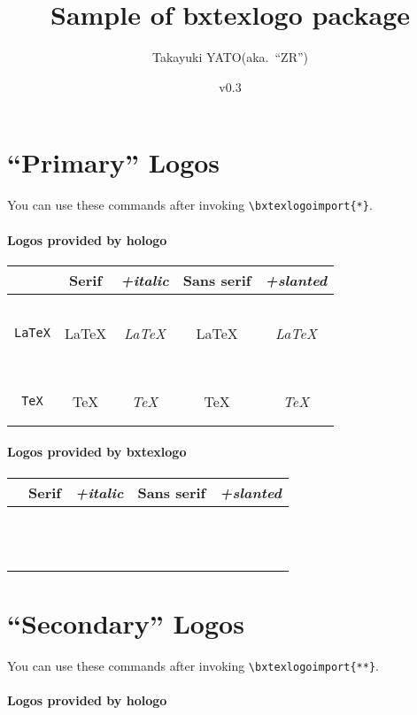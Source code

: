 \documentclass[a4paper]{article}
\newcommand{\PkgVersion}{0.3}
\newcommand{\PkgDate}{2017/11/11}
\newcommand{\Pkg}[1]{\textsf{#1}}
\newenvironment{LogoSamples}{%
  \begin{center}\begin{tabular}{ccccc}
    \hline \phantom{\LARGE I}
        & \textrm{Serif} & \textit{+italic}
        & \textsf{Sans serif} & \textsl{+slanted}
    \\\hline
}{%
    \hline
  \end{tabular}\end{center}
}
\newcommand*{\LSEntry}[1]{%
  \texttt{\string#1} & \textrm{#1} & \textit{#1}
      & \textsf{#1} & \textsf{\textsl{#1}}
  \\}
\begin{document}
\title{Sample of \Pkg{bxtexlogo} package}
\author{Takayuki YATO\quad (aka.~``ZR'')}
\date{v\PkgVersion \quad[\PkgDate]}
\maketitle

\section{``Primary'' Logos}

You can use these commands after invoking
\verb|\bxtexlogoimport{*}|.

\paragraph{Logos provided by \Pkg{hologo}}\mbox{}

\begin{LogoSamples}
\LSEntry{\AmSLaTeX}
\LSEntry{\AmSTeX}
\LSEntry{\BibTeX}
\LSEntry{\ConTeXt}
\LSEntry{\eTeX}
\LSEntry{\LaTeX}
\LSEntry{\LaTeXe}
\LSEntry{\LuaLaTeX}
\LSEntry{\LuaTeX}
\LSEntry{\LyX}
\LSEntry{\METAFONT}
\LSEntry{\METAPOST}
\LSEntry{\pdfTeX}
\LSEntry{\pdfLaTeX}
\LSEntry{\TeX}
\LSEntry{\XeLaTeX}
\LSEntry{\XeTeX}
\end{LogoSamples}

\paragraph{Logos provided by \Pkg{bxtexlogo}}\mbox{}

\begin{LogoSamples}
\LSEntry{\epTeX}
\LSEntry{\eupTeX}
\LSEntry{\JBibTeX}
\LSEntry{\pBibTeX}
\LSEntry{\pLaTeXe}
\LSEntry{\pLaTeX}
\LSEntry{\pTeX}
\LSEntry{\TikZ}
\LSEntry{\upBibTeX}
\LSEntry{\upLaTeX}
\LSEntry{\upLaTeXe}
\LSEntry{\upTeX}
\end{LogoSamples}

\newpage
\section{``Secondary'' Logos}

You can use these commands after invoking
\verb|\bxtexlogoimport{**}|.

\paragraph{Logos provided by \Pkg{hologo}}\mbox{}
\end{document}
